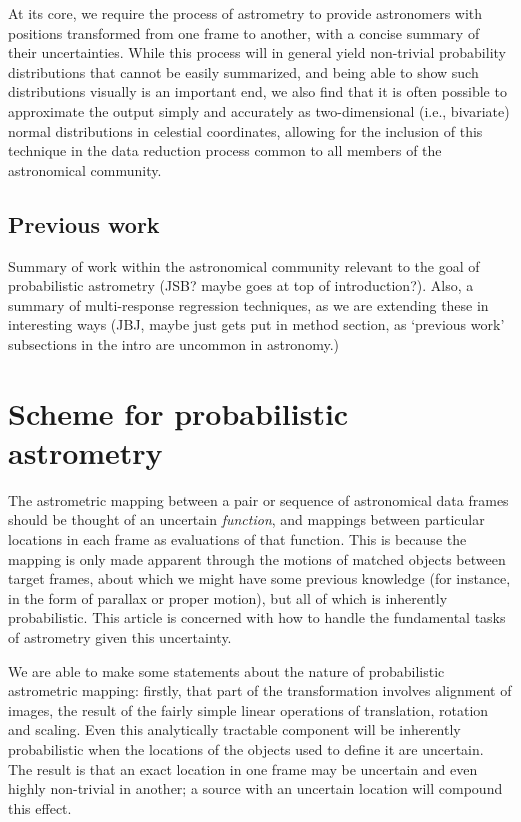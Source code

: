 \documentclass[manuscript]{aastex}
\begin{document}
At its core, we require the process of astrometry to provide astronomers with positions transformed from one frame to another, with a concise summary of their uncertainties. While this process will in general yield non-trivial probability distributions that cannot be easily summarized, and being able to show such distributions visually is an important end, we also find that it is often possible to approximate the output simply and accurately as two-dimensional (i.e., bivariate) normal distributions in celestial coordinates, allowing for the inclusion of this technique in the data reduction process common to all members of the astronomical community.

\subsection{Previous work}
Summary of work within the astronomical community relevant to the goal of probabilistic astrometry (JSB? maybe goes at top of introduction?). Also, a summary of multi-response regression techniques, as we are extending these in interesting ways (JBJ, maybe just gets put in method section, as `previous work' subsections in the intro are uncommon in astronomy.)

\section{Scheme for probabilistic astrometry}\label{sec:scheme}
The astrometric mapping between a pair or sequence of astronomical data frames should be thought of an uncertain \emph{function}, and mappings between particular locations in each frame as evaluations of that function. This is because the mapping is only made apparent through the motions of matched objects between target frames, about which we might have some previous knowledge (for instance, in the form of parallax or proper motion), but all of which is inherently probabilistic. This article is concerned with how to handle the fundamental tasks of astrometry given this uncertainty.

We are able to make some statements about the nature of probabilistic astrometric mapping: firstly, that part of the transformation involves alignment of images, the result of the fairly simple linear operations of translation, rotation and scaling. Even this analytically tractable component will be inherently probabilistic when the locations of the objects used to define it are uncertain. The result is that an exact location in one frame may be uncertain and even highly non-trivial in another; a source with an uncertain location will compound this effect.
\end{document}
